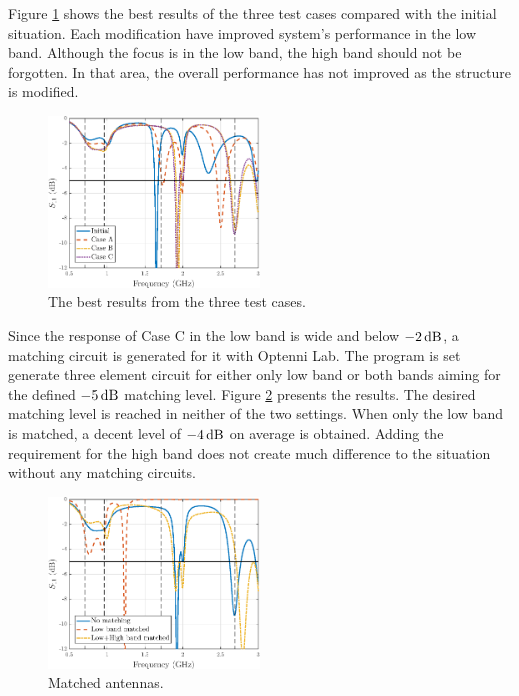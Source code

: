 Figure \ref{fig:concept2} shows the best results of the three test cases compared with the initial situation. Each modification have improved system's performance in the low band. Although the focus is in the low band, the high band should not be forgotten. In that area, the overall performance has not improved as the structure is modified. 
\begin{figure}[H]
    \centering
    \includegraphics[width=0.5\textwidth]{img/concept2.eps}
    \caption{The best results from the three test cases.}
    \label{fig:concept2}
\end{figure}

Since the response of Case C in the low band is wide and below $-2\,\mathrm{dB}$, a matching circuit is generated for it with Optenni Lab. The program is set generate three element circuit for either only low band or both bands aiming for the defined $-5\,\mathrm{dB}$ matching level. Figure \ref{fig:concept2_match} presents the results. The desired matching level is reached in neither of the two settings. When only the low band is matched, a decent level of $-4\,\mathrm{dB}$ on average is obtained. Adding the requirement for the high band does not create much difference to the situation without any matching circuits. 
\begin{figure}[H]
    \centering
    \includegraphics[width=0.5\textwidth]{img/concept2_match.eps}
    \caption{Matched antennas.}
    \label{fig:concept2_match}
\end{figure}

